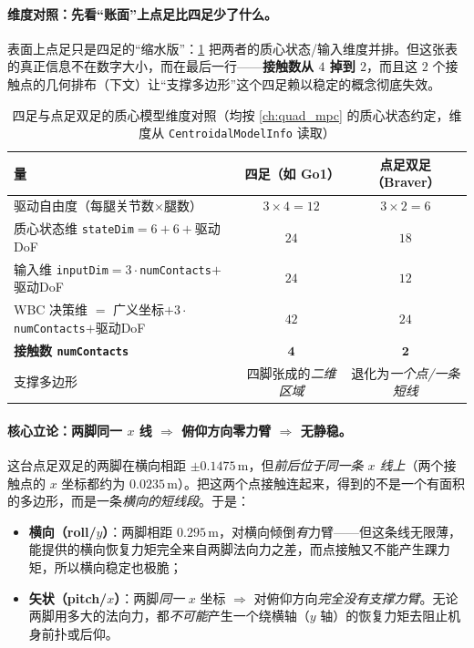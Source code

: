\paragraph{维度对照：先看“账面”上点足比四足少了什么。}
表面上点足只是四足的“缩水版”：\cref{tab:lb-dims} 把两者的质心状态/输入维度并排。但这张表的真正信息不在数字大小，而在最后一行——\textbf{接触数从 $4$ 掉到 $2$}，而且这 $2$ 个接触点的几何排布（下文）让“支撑多边形”这个四足赖以稳定的概念彻底失效。

\begin{table}[H]\centering\small
\caption{四足与点足双足的质心模型维度对照（均按 \cref{ch:quad_mpc} 的质心状态约定，维度从 \texttt{CentroidalModelInfo} 读取）}
\begin{tabular}{lcc}
\toprule
量 & 四足（如 Go1） & 点足双足（Braver） \\
\midrule
驱动自由度（每腿关节数$\times$腿数） & $3\times4=12$ & $3\times2=6$ \\
质心状态维 \texttt{stateDim}$=6+6+$驱动DoF & $24$ & $18$ \\
输入维 \texttt{inputDim}$=3\cdot$\texttt{numContacts}$+$驱动DoF & $24$ & $12$ \\
WBC 决策维 $=$ 广义坐标$+3\cdot$\texttt{numContacts}$+$驱动DoF & $42$ & $24$ \\
\textbf{接触数 \texttt{numContacts}} & $\mathbf{4}$ & $\mathbf{2}$ \\
支撑多边形 & 四脚张成的\emph{二维区域} & 退化为\emph{一个点/一条短线} \\
\bottomrule
\end{tabular}
\label{tab:lb-dims}
\end{table}

\paragraph{核心立论：两脚同一 $x$ 线 $\Rightarrow$ 俯仰方向零力臂 $\Rightarrow$ 无静稳。}
这台点足双足的两脚在横向相距 $\pm 0.1475\,\mathrm{m}$，但\emph{前后位于同一条 $x$ 线上}（两个接触点的 $x$ 坐标都约为 $0.0235\,\mathrm{m}$）。把这两个点接触连起来，得到的不是一个有面积的多边形，而是一条\emph{横向的短线段}。于是：

\begin{itemize}
  \item \textbf{横向（roll/$y$）}：两脚相距 $0.295\,\mathrm{m}$，对横向倾倒\emph{有}力臂——但这条线无限薄，能提供的横向恢复力矩完全来自两脚法向力之差，而点接触又不能产生踝力矩，所以横向稳定也极脆；
  \item \textbf{矢状（pitch/$x$）}：两脚\emph{同一} $x$ 坐标 $\Rightarrow$ 对俯仰方向\emph{完全没有支撑力臂}。无论两脚用多大的法向力，都\emph{不可能}产生一个绕横轴（$y$ 轴）的恢复力矩去阻止机身前扑或后仰。
\end{itemize}

